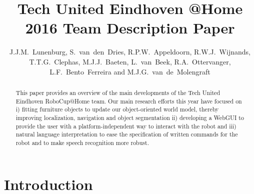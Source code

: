 \documentclass[runningheads,a4paper]{llncs}
\begin{document}
\title{Tech United Eindhoven @Home\\2016 Team Description Paper}
\author{J.J.M.~Lunenburg, S.~van~den~Dries, R.P.W.~Appeldoorn, R.W.J.~Wijnands, T.T.G.~Clephas, M.J.J.~Baeten, L.~van~Beek, R.A.~Ottervanger, L.F.~Bento~Ferreira and M.J.G.~van~de~Molengraft}

\maketitle



\begin{abstract}
This paper provides an overview of the main developments of the Tech United Eindhoven RoboCup@Home team. 
Our main research efforts this year have focused on i) fitting furniture objects to update our object-oriented world model, thereby improving localization, navigation and object segmentation ii) developing a WebGUI to provide the user with a platform-independent way to interact with the robot and iii) natural language interpretation to ease the specification of written commands for the robot and to make speech recognition more robust.
\end{abstract}



\section{Introduction}

\end{document}
